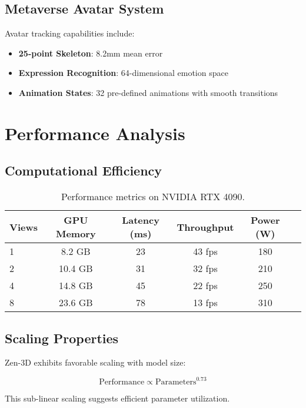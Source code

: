 \documentclass[11pt,a4paper]{article}
\begin{document}
\subsection{Metaverse Avatar System}

Avatar tracking capabilities include:

\begin{itemize}
    \item \textbf{25-point Skeleton}: 8.2mm mean error
    \item \textbf{Expression Recognition}: 64-dimensional emotion space
    \item \textbf{Animation States}: 32 pre-defined animations with smooth transitions
\end{itemize}

\section{Performance Analysis}

\subsection{Computational Efficiency}

\begin{table}[h]
\centering
\begin{tabular}{lccccc}
\toprule
Views & GPU Memory & Latency (ms) & Throughput & Power (W) \\
\midrule
1 & 8.2 GB & 23 & 43 fps & 180 \\
2 & 10.4 GB & 31 & 32 fps & 210 \\
4 & 14.8 GB & 45 & 22 fps & 250 \\
8 & 23.6 GB & 78 & 13 fps & 310 \\
\bottomrule
\end{tabular}
\caption{Performance metrics on NVIDIA RTX 4090.}
\end{table}

\subsection{Scaling Properties}

Zen-3D exhibits favorable scaling with model size:

\begin{equation}
    \text{Performance} \propto \text{Parameters}^{0.73}
\end{equation}

This sub-linear scaling suggests efficient parameter utilization.
\end{document}
